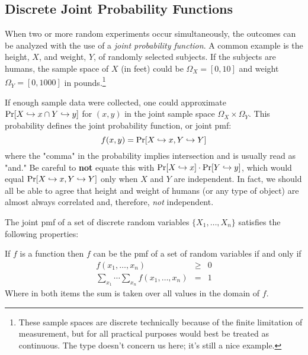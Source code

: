 \documentclass[../main.tex]{subfiles}
\begin{document}
\subsection{Discrete Joint Probability Functions}

When two or more random experiments occur simultaneously, the 
outcomes can be analyzed with the use of a \textit{joint probability
function}. A common example is the height, $X$,  and weight, $Y$, of randomly selected subjects. If the subjects are humans, the sample space of $X$ (in feet) could 
be $\Omega_X = [0,10]$ and weight $\Omega_Y = [0,1000]$ in pounds.\footnote{These
sample spaces are discrete technically because of the finite limitation
of measurement, but for all practical purposes would best be treated as
continuous. The type doesn't concern us here; it's still a nice example.}

If enough sample data were collected, one could approximate $\mathrm{Pr}[X \hookrightarrow x \cap Y \hookrightarrow y]$ for $(x,y)$ in the joint sample space $\Omega_X \times
\Omega_Y$. This probability defines the joint probability function, or joint pmf:
$$f(x,y) = \mathrm{Pr}[X \hookrightarrow x, Y \hookrightarrow Y]$$
where the "comma" in the probability implies intersection and is usually read as "and." Be careful to \textbf{not} equate this with $\mathrm{Pr}[X \hookrightarrow x]\cdot\mathrm{Pr}[Y \hookrightarrow y]$, which would equal $\mathrm{Pr}[X \hookrightarrow x, Y \hookrightarrow Y]$
only when $X$ and $Y$ are independent. In fact, we should all be able to agree that height and weight of humans (or any type of object) are
almost always correlated and, therefore, \textit{not} independent.

The joint pmf of a set of discrete random variables $\{X_1, \ldots, X_n\}$
satisfies the following properties:
\begin{theorem} If $f$ is a function then $f$ can be the pmf of a set of random variables if and only if
\begin{eqnarray}
     f(x_1,\ldots,x_n) &\geq& 0 \\
    \sum_{x_1}\cdots\sum_{x_n}f(x_1,\ldots,x_n) &=& 1
\end{eqnarray}
Where in both items the sum is taken over all values in the domain of $f$.
\end{theorem}
\end{document}

